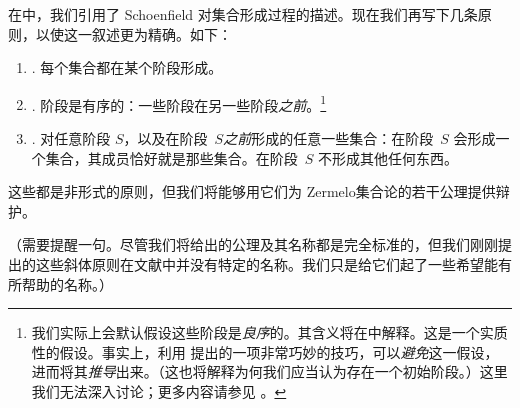 \documentclass[../../../include/open-logic-section]{subfiles}
\begin{document}

在中，我们引用了 Schoenfield 对集合形成过程的描述。现在我们再写下几条原则，以使这一叙述更为精确。如下：

\begin{enumerate}
\item[] \stageshier. 每个集合都在某个阶段形成。
\item[] \stagesord. 阶段是有序的：一些阶段在另一些阶段\emph{之前}。\footnote{我们实际上会默认假设这些阶段是\emph{良序}的。其含义将在中解释。这是一个实质性的假设。事实上，利用 \citet{Scott1974} 提出的一项非常巧妙的技巧，可以\emph{避免}这一假设，进而将其\emph{推导}出来。（这也将解释为何我们应当认为存在一个初始阶段。）这里我们无法深入讨论；更多内容请参见 \citet{ButtonLT1}。}
\item[] \stagesacc. 对任意阶段 $S$，以及在阶段~$S$\emph{之前}形成的任意一些集合：在阶段~$S$ 会形成一个集合，其成员恰好就是那些集合。在阶段~$S$ 不形成其他任何东西。
\end{enumerate}

这些都是非形式的原则，但我们将能够用它们为 Zermelo集合论的若干公理提供辩护。

（需要提醒一句。尽管我们将给出的公理及其名称都是完全标准的，但我们刚刚提出的这些斜体原则在文献中并没有特定的名称。我们只是给它们起了一些希望能有所帮助的名称。）
\end{document}
